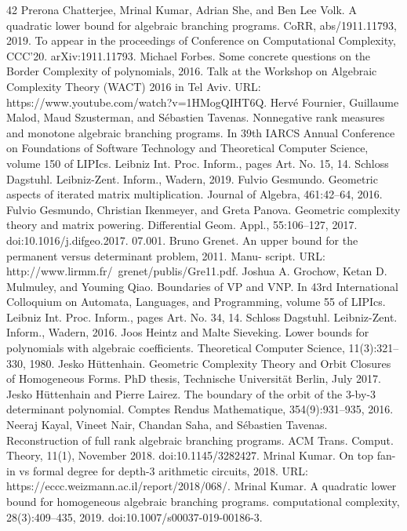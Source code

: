 \documentclass[10pt,a4paper]{article}
\begin{document}
\begin{thebibliography}{42}
 Prerona Chatterjee, Mrinal Kumar, Adrian She, and Ben Lee Volk. A quadratic lower bound for algebraic branching programs. CoRR, abs/1911.11793, 2019. To appear in the proceedings of Conference on Computational Complexity, CCC’20. arXiv:1911.11793.
 Michael Forbes. Some concrete questions on the Border Complexity of polynomials, 2016. Talk at the Workshop on Algebraic Complexity Theory (WACT) 2016 in Tel Aviv. URL: https://www.youtube.com/watch?v=1HMogQIHT6Q.
 Hervé Fournier, Guillaume Malod, Maud Szusterman, and Sébastien Tavenas. Nonnegative rank measures and monotone algebraic branching programs. In 39th IARCS Annual Conference on Foundations of Software Technology and Theoretical Computer Science, volume 150 of LIPIcs. Leibniz Int. Proc. Inform., pages Art. No. 15, 14. Schloss Dagstuhl. Leibniz-Zent. Inform., Wadern, 2019.
 Fulvio Gesmundo. Geometric aspects of iterated matrix multiplication. Journal of Algebra, 461:42–64, 2016.
 Fulvio Gesmundo, Christian Ikenmeyer, and Greta Panova. Geometric complexity theory and matrix powering. Differential Geom. Appl., 55:106–127, 2017. doi:10.1016/j.difgeo.2017. 07.001.
 Bruno Grenet. An upper bound for the permanent versus determinant problem, 2011. Manu- script. URL: http://www.lirmm.fr/~grenet/publis/Gre11.pdf.
 Joshua A. Grochow, Ketan D. Mulmuley, and Youming Qiao. Boundaries of VP and VNP. In 43rd International Colloquium on Automata, Languages, and Programming, volume 55 of LIPIcs. Leibniz Int. Proc. Inform., pages Art. No. 34, 14. Schloss Dagstuhl. Leibniz-Zent. Inform., Wadern, 2016.
 Joos Heintz and Malte Sieveking. Lower bounds for polynomials with algebraic coefficients. Theoretical Computer Science, 11(3):321–330, 1980.
 Jesko Hüttenhain. Geometric Complexity Theory and Orbit Closures of Homogeneous Forms. PhD thesis, Technische Universität Berlin, July 2017.
 Jesko Hüttenhain and Pierre Lairez. The boundary of the orbit of the 3-by-3 determinant polynomial. Comptes Rendus Mathematique, 354(9):931–935, 2016.
 Neeraj Kayal, Vineet Nair, Chandan Saha, and Sébastien Tavenas. Reconstruction of full rank algebraic branching programs. ACM Trans. Comput. Theory, 11(1), November 2018. doi:10.1145/3282427.
 Mrinal Kumar. On top fan-in vs formal degree for depth-3 arithmetic circuits, 2018. URL: https://eccc.weizmann.ac.il/report/2018/068/.
 Mrinal Kumar. A quadratic lower bound for homogeneous algebraic branching programs. computational complexity, 28(3):409–435, 2019. doi:10.1007/s00037-019-00186-3.

\end{thebibliography}
\end{document}
